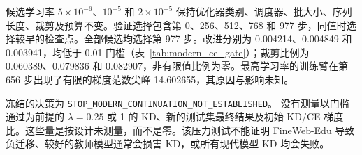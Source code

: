 候选学习率 $5\times10^{-6}$、$10^{-5}$ 和 $2\times10^{-5}$ 保持优化器类别、调度器、批大小、序列长度、裁剪及预算不变。验证选择包含第 0、256、512、768 和 977 步，同值时选择较早的检查点。全部候选均选择第 977 步。改进分别为 0.004214、0.004849 和 0.003941，均低于 0.01 门槛（表~\ref{tab:modern_ce_gate}）；裁剪比例为 0.060389、0.079836 和 0.082907，非有限值比例为零。最高学习率的训练臂在第 656 步出现了有限的梯度范数尖峰 14.602655，其原因与影响未知。

冻结的决策为
\texttt{STOP\_}\allowbreak\texttt{MODERN\_}\allowbreak\texttt{CONTINUATION\_}\allowbreak\texttt{NOT\_}\allowbreak\texttt{ESTABLISHED}。
没有测量以门槛通过为前提的 $\lambda=0.25$ 或 1 的 KD、新的测试集最终结果及初始 KD/CE 梯度比。这些量是按设计未测量，而不是零。该压力测试不能证明 FineWeb-Edu 导致负迁移、较好的教师模型通常会损害 KD，或所有现代模型 KD 均会失败。

